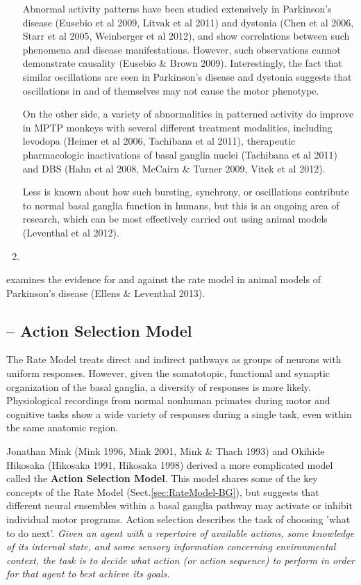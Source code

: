 \begin{enumerate}
Abnormal activity patterns have been studied extensively in Parkinson's disease
(Eusebio et al 2009, Litvak et al 2011) and dystonia (Chen et al 2006, Starr et
al 2005, Weinberger et al 2012), and show correlations between such phenomena
and disease manifestations. However, such observations cannot demonstrate
causality (Eusebio \& Brown 2009).   
Interestingly, the fact that similar oscillations are seen in Parkinson's
disease and dystonia suggests that oscillations in and of themselves may not
cause the motor phenotype.

On the other side,  a variety of abnormalities in patterned activity do improve
in MPTP monkeys with several different treatment modalities, including levodopa
(Heimer et al 2006, Tachibana et al 2011), therapeutic pharmacologic
inactivations of basal ganglia nuclei (Tachibana et al 2011) and DBS (Hahn et al
2008, McCairn \& Turner 2009, Vitek et al 2012).

Less is known about how such bursting, synchrony, or oscillations contribute to
normal basal ganglia function in humans, but this is an ongoing area of
research, which can be most effectively carried out using animal models
(Leventhal et al 2012).
  

  \item 
\end{enumerate}

examines the evidence for and against the rate model in animal models of
Parkinson's disease (Ellens \& Leventhal 2013).




\subsection{-- Action Selection Model}
\label{sec:Action-Selection-Model}

The Rate Model treats direct and indirect pathways as groups of neurons with
uniform responses. However, given the somatotopic, functional and synaptic
organization of the basal ganglia, a diversity of responses is more likely.
Physiological recordings from normal nonhuman primates during motor and
cognitive tasks show a wide variety of responses during a single task, even
within the same anatomic region.

Jonathan Mink (Mink 1996, Mink 2001, Mink \& Thach 1993) and Okihide Hikosaka
(Hikosaka 1991, Hikosaka 1998) derived a more complicated model called the
{\bf Action Selection Model}. This model shares some of the key concepts of the
Rate Model (Sect.\ref{sec:RateModel-BG}), but suggests that different neural
ensembles within a basal ganglia pathway may activate or inhibit individual
motor programs. 
Action selection describes the task of choosing 'what to do next'.
{\it Given an agent with a repertoire of available actions, some knowledge of
its internal state, and some sensory information concerning environmental context,
the task is to decide what action (or action sequence) to perform in order for
that agent to best achieve its goals.}  


